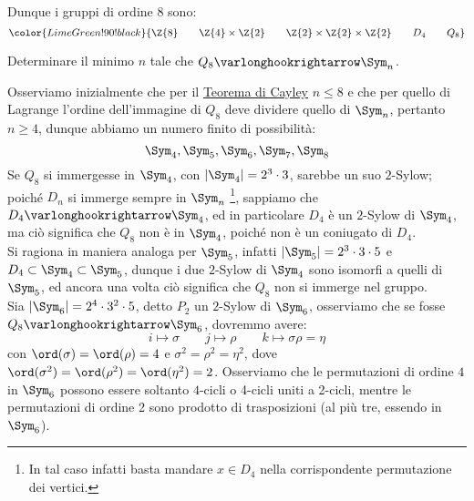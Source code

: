 \documentclass[11pt]{scrartcl}
\begin{document}
Dunque i gruppi di ordine 8 sono:
    \[ \color{LimeGreen!90!black}{\Z{8} \qquad \Z{4} \times \Z{2} \qquad \Z{2} \times \Z{2} \times \Z{2} \qquad D_4 \qquad Q_8}
        \]

\newpage
\begin{exercise}
    Determinare il minimo $n$ tale che $Q_8 \varlonghookrightarrow \Sym_n$.
\end{exercise}

\begin{soln}
    Osserviamo inizialmente che per il \hyperref[p:Cayley]{Teorema di Cayley} $n \leq 8$ e che per quello di Lagrange l'ordine dell'immagine di $Q_8$ deve dividere quello di $\Sym_n$, pertanto $n \geq 4$, dunque abbiamo un numero finito di possibilità:
        \[ \Sym_4,\Sym_{5},\Sym_{6},\Sym_{7},\Sym_{8}
            \]
    Se $Q_8$ si immergesse in $\Sym_4$, con $|\Sym_4| = 2^3 \cdot 3$, sarebbe un suo $2$-Sylow; poiché $D_n$ si immerge sempre in $\Sym_n$ \footnote{In tal caso infatti basta mandare $x \in D_4$ nella corrispondente permutazione dei vertici.}, sappiamo che $D_4 \varlonghookrightarrow \Sym_4$, 
    ed in particolare $D_4$ è un $2$-Sylow di $\Sym_4$, ma ciò significa che $Q_8$ non è in $\Sym_4$, poiché non è un coniugato di $D_4$. \\
    Si ragiona in maniera analoga per $\Sym_{5}$, infatti $|\Sym_{5}| = 2^3 \cdot 3 \cdot 5$ e $D_4 \subset \Sym_4 \subset \Sym_{5}$, dunque i due $2$-Sylow di $\Sym_4$ sono isomorfi a quelli di $\Sym_{5}$, ed ancora una volta ciò significa che $Q_8$ non si immerge nel gruppo.\\
    Sia $|\Sym_{6}| = 2^4 \cdot 3^2 \cdot 5$, detto $P_2$ un $2$-Sylow di $\Sym_{6}$, osserviamo che se fosse $Q_8 \varlonghookrightarrow \Sym_{6}$, dovremmo avere:
        \[ i \longmapsto \sigma \qquad j \longmapsto \rho \qquad k \longmapsto \sigma\rho = \eta
            \]
    con $\ord(\sigma) = \ord(\rho) = 4$ e $\sigma^2 = \rho^2 = \eta^2$, dove $\ord(\sigma^2) = \ord(\rho^2) = \ord(\eta^2) = 2$. Osserviamo che le permutazioni di ordine $4$ in $\Sym_{6}$ possono essere soltanto $4$-cicli o 4-cicli uniti a 2-cicli, mentre
    le permutazioni di ordine 2 sono prodotto di trasposizioni (al più tre, essendo in $\Sym_{6}$).


\end{soln}
\end{document}
